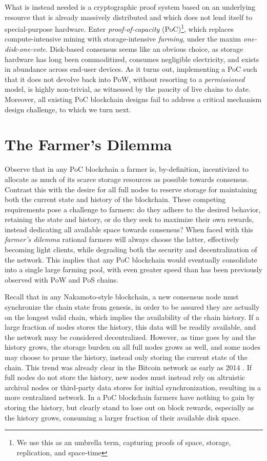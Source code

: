 \documentclass[conference]{IEEEtran}
\begin{document}
What is instead needed is a cryptographic proof system based on an underlying resource that is already massively distributed and which does not lend itself to special-purpose hardware. Enter \textit{proof-of-capacity} (PoC)\footnote{We use this as an umbrella term, capturing proofs of space, storage, replication, and space-time}, which replaces compute-intensive mining with storage-intensive \textit{farming}, under the maxim \textit{one-disk-one-vote}. Disk-based consensus seems like an obvious choice, as storage hardware has long been commoditized, consumes negligible electricity, and exists in abundance across end-user devices. As it turns out, implementing a PoC such that it does not devolve back into PoW, without resorting to a \textit{permissioned} model, is highly non-trivial, as witnessed by the paucity of live chains to date. Moreover, all existing PoC blockchain designs fail to address a critical mechanism design challenge, to which we turn next. 

\section{The Farmer's Dilemma}

Observe that in any PoC blockchain a farmer is, by-definition, incentivized to allocate as much of its scarce storage resources as possible towards consensus. Contrast this with the desire for all full nodes to reserve storage for maintaining both the current state and history of the blockchain. These competing requirements pose a challenge to farmers: do they adhere to the desired behavior, retaining the state and history, or do they seek to maximize their own rewards, instead dedicating all available space towards consensus? When faced with this \textit{farmer’s dilemma} rational farmers will always choose the latter, effectively becoming light clients, while degrading both the security and decentralization of the network. This implies that any PoC blockchain would eventually consolidate into a single large farming pool, with even greater speed than has been previously observed with PoW and PoS chains.

Recall that in any Nakamoto-style blockchain, a new consensus node must synchronize the chain state from genesis, in order to be assured they are actually on the longest valid chain, which implies the availability of the chain history. If a large fraction of nodes stores the history, this data will be readily available, and the network may be considered decentralized. However, as time goes by and the history grows, the storage burden on all full nodes grows as well, and some nodes may choose to prune the history, instead only storing the current state of the chain. This trend was already clear in the Bitcoin network as early as 2014 \cite{lerner_2015}. If full nodes do not store the history, new nodes must instead rely on altruistic archival nodes or third-party data stores for initial synchronization, resulting in a more centralized network. In a PoC blockchain farmers have nothing to gain by storing the history, but clearly stand to lose out on block rewards, especially as the history grows, consuming a larger fraction of their available disk space.
\end{document}

